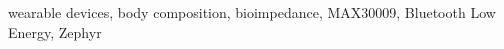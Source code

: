 \documentclass[diplomskirad, numeric, utf8, times]{fer}
\begin{document}
\begin{keywords}
wearable devices, body composition, bioimpedance, MAX30009, Bluetooth Low Energy, Zephyr 
\end{keywords}



\backmatter


\end{document}
